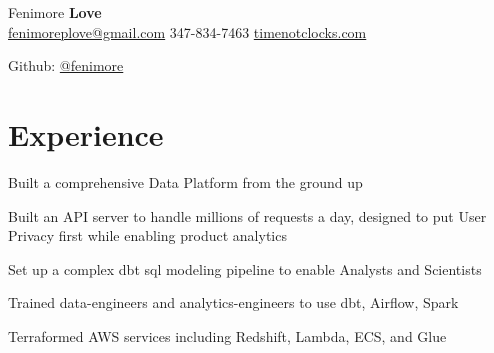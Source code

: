\documentclass[]{deedy-resume-openfont}
\begin{document}
%
%

%
%
\hspace{-5.5mm}
\begin{minipage}[t]{.6\textwidth}
{\Huge Fenimore {\textbf{Love}}}\\
\href{mailto:fenimoreplove@gmail.com}{fenimoreplove@gmail.com} \textbullet{} 347-834-7463 \textbullet{} \href{https://timenotclocks.com}{timenotclocks.com}\\
\end{minipage}
\hfill
\begin{minipage}[t]{.3\textwidth}
Github: \href{https://github.com/fenimore}{@fenimore}
\end{minipage}
\namesection{}{} %


\section{Experience}
\vspace{\topsep} %

\vspace{\topsep} %
\begin{tightemize}
\item Built a comprehensive Data Platform from the ground up
\item Built an API server to handle millions of requests a day, designed to put User Privacy first while enabling product analytics
\item Set up a complex dbt sql modeling pipeline to enable Analysts and Scientists
\item Trained data-engineers and analytics-engineers to use dbt, Airflow, Spark
\item Terraformed AWS services including Redshift, Lambda, ECS, and Glue
\end{tightemize}

\vspace{\topsep} %
\end{document}
